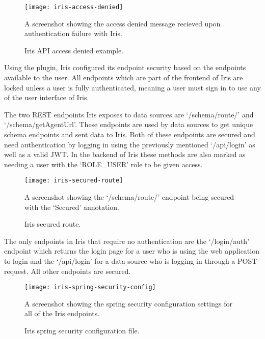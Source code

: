 \documentclass[12pt,a4paper,titlepage]{report}
\begin{document}
\begin{figure}[H]
\begin{tcolorbox}
\begin{center}
\texttt{[image: iris-access-denied]}
\end{center}
A screenshot showing the access denied message recieved upon authentication failure with Iris.
\end{tcolorbox}
\caption{Iris API access denied example.}
\end{figure}

Using the plugin, Iris configured its endpoint security based on the endpoints available to the user. All endpoints which are part of the frontend of Iris are locked unless a user is fully authenticated, meaning a user must sign in to use any of the user interface of Iris.

The two REST endpoints Iris exposes to data sources are `/schema/route/' and `/schema/getAgentUrl'. These endpoints are used by data sources to get unique schema endpoints and sent data to Iris. Both of these endpoints are secured and need authentication by logging in using the previously mentioned `/api/login' as well as a valid JWT. In the backend of Iris these methods are also marked as needing a user with the `ROLE\_USER' role to be given access.

\begin{figure}[H]
\begin{tcolorbox}
\begin{center}
\texttt{[image: iris-secured-route]}
\end{center}
A screenshot showing the `/schema/route/' endpoint being secured with the `Secured' annotation.
\end{tcolorbox}
\caption{Iris secured route.}
\end{figure}

The only endpoints in Iris that require no authentication are the `/login/auth' endpoint which returns the login page for a user who is using the web application to login and the `/api/login' for a data source who is logging in through a POST request. All other endpoints are secured.

\begin{figure}[H]
\begin{tcolorbox}
\begin{center}
\texttt{[image: iris-spring-security-config]}
\end{center}
A screenshot showing the spring security configuration settings for all of the Iris endpoints.
\end{tcolorbox}
\caption{Iris spring security configuration file.}
\end{figure}
\end{document}
